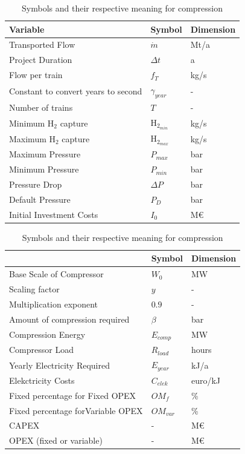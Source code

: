 \documentclass{article}
\begin{document}
\begin{table}[h!]
\parbox{0.45\linewidth}{
\centering
\begin{tabular}[t]{@{}lll@{}}
\toprule
Variable              &  	Symbol  & Dimension \\ \midrule
Transported Flow &$\dot{m} $& Mt/a\\
Project Duration &$\Delta t$& a\\
Flow per train &$ f_T$& kg/s \\
Constant to convert years to second &$\gamma_{year}$& - \\
Number of trains &$T$& - \\
Minimum H$_2$ capture &H$_{2_{min}}$& kg/s\\
Maximum H$_2$ capture &H$_{2_{max}}$& kg/s\\
Maximum Pressure & $P_{max}$ &bar \\
Minimum Pressure & $P_{min}$ &bar \\
Pressure Drop & $ \Delta P$& bar \\
Default Pressure &$P_D$& bar\\
Initial Investment Costs &$I_0$& M€\\
\end{tabular}
}\hfill
\parbox{0.45\linewidth}{
\centering
\begin{tabular}[t]{@{}lll@{}}
\toprule
       &  	Symbol  & Dimension \\ \midrule
Base Scale of Compressor&$W_0$& MW\\
Scaling factor &$y$& -\\
Multiplication exponent &$ 0.9$& -\\
Amount of compression required &$\beta$& bar\\
Compression Energy&$E_{comp}$& MW \\
Compressor Load &$R_{load}$& hours\\
Yearly Electricity Required &$ E_{year}$& kJ/a\\
Elekctricity Costs &$C_{elek}$& euro/kJ\\ 
Fixed percentage for Fixed OPEX &$OM_f$& \%\\
Fixed percentage forVariable OPEX &$OM_{var}$& \%\\
CAPEX& - & M€\\
OPEX (fixed or variable)& - & M€\\
\end{tabular}
}
\caption{Symbols and their respective meaning for compression}
\label{table:Symbols2}
\end{table}
\end{document}
